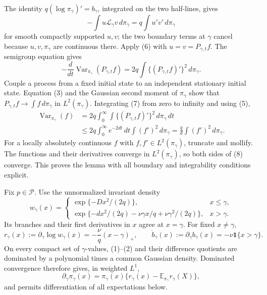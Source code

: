 The identity \(q(\log\pi_\gamma)'=b_\gamma\), integrated on the two half-lines, gives
\[
 -\int u\mathcal L_\gamma v\,d\pi_\gamma
 =q\int u'v'\,d\pi_\gamma                                  \tag{6}
\]
for smooth compactly supported \(u,v\); the two boundary terms at \(\gamma\) cancel because \(u,v,\pi_\gamma\) are continuous there.  Apply (6) with \(u=v=P_{\gamma,t}f\).  The semigroup equation gives
\[
 -\frac{d}{dt}\operatorname{Var}_{\pi_\gamma}(P_{\gamma,t}f)
 =2q\int\{(P_{\gamma,t}f)'\}^2\,d\pi_\gamma.                \tag{7}
\]
Couple a process from a fixed initial state to an independent stationary initial state.  Equation (3) and the Gaussian second moment of \(\pi_\gamma\) show that \(P_{\gamma,t}f\to\int f\,d\pi_\gamma\) in \(L^2(\pi_\gamma)\).  Integrating (7) from zero to infinity and using (5),
\[
 \begin{split}
 \operatorname{Var}_{\pi_\gamma}(f)
 &=2q\int_0^\infty\int\{(P_{\gamma,t}f)'\}^2\,d\pi_\gamma\,dt\\
 &\leq2q\int_0^\infty e^{-2dt}\,dt\int(f')^2\,d\pi_\gamma
 =\frac qd\int(f')^2\,d\pi_\gamma.                           \tag{8}
 \end{split}
\]
For a locally absolutely continuous \(f\) with \(f,f'\in L^2(\pi_\gamma)\), truncate and mollify.  The functions and their derivatives converge in \(L^2(\pi_\gamma)\), so both sides of (8) converge.  This proves the lemma with all boundary and integrability conditions explicit.

Fix \(p\in\mathcal P\).  Use the unnormalized invariant density
\[
 w_\gamma(x)=
 \begin{cases}
 \exp\{-Dx^2/(2q)\},&x\leq\gamma,\\
 \exp\{-dx^2/(2q)-\nu\gamma x/q+\nu\gamma^2/(2q)\},&x>\gamma.
 \end{cases}                                                   \tag{1}
\]
Its branches and their first derivatives in \(x\) agree at \(x=\gamma\).  For fixed \(x\ne\gamma\),
\[
 r_\gamma(x):=\partial_\gamma\log w_\gamma(x)
 =-\frac\nu q(x-\gamma)_+,
 \qquad
 \dot b_\gamma(x):=\partial_\gamma b_\gamma(x)
 =-\nu\mathbf1\{x>\gamma\}.                                 \tag{2}
\]
On every compact set of \(\gamma\)-values, (1)--(2) and their difference quotients are dominated by a polynomial times a common Gaussian density.  Dominated convergence therefore gives, in weighted \(L^1\),
\[
 \partial_\gamma\pi_\gamma(x)
 =\pi_\gamma(x)\{r_\gamma(x)-\mathbb E_{\pi_\gamma}r_\gamma(X)\}, \tag{3}
\]
and permits differentiation of all expectations below.


